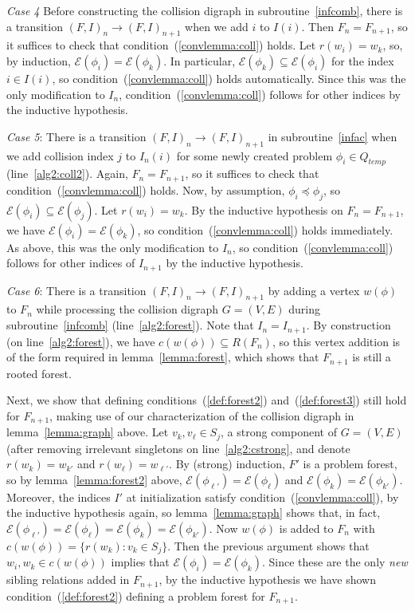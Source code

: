 \documentclass[11pt,reqno]{amsart}
\theoremstyle{definition}
\numberwithin{equation}{section}
\newcommand{\pre}{\phi}
\newcommand{\sub}{\subseteq}
\newcommand{\fix}{\mathcal{E}}
\newcommand{\peq}{\preceq}
\newcommand{\strongcomp}{S}
\newcommand{\actt}{Q_{temp}}
\newcommand{\coll}{I}
\newcommand{\forest}{F}
\newcommand{\pair}{(F,I)}
\newcommand{\roott}{R}
\begin{document}
\begin{enumerate}
\emph{Case 4} Before constructing the collision digraph in subroutine~\ref{infcomb}, there is a transition $\pair_n \to \pair_{n + 1}$ when we add $i$ to $\coll(i)$. 
Then $\forest_n = \forest_{n + 1}$, so it suffices to check that condition~(\ref{convlemma:coll}) holds. 
Let $r(w_i) = w_k$, so, by induction, $\fix(\pre_i) = \fix(\pre_k)$. 
In particular, $\fix(\pre_k) \sub \fix(\pre_i)$ for the index $i \in \coll(i)$, so condition~(\ref{convlemma:coll}) holds automatically.
Since this was the only modification to $\coll_n$, condition~(\ref{convlemma:coll}) follows for other indices by the inductive hypothesis.

\emph{Case 5}: There is a transition $\pair_n \to \pair_{n + 1}$ in subroutine~\ref{infac} when we add collision index $j$ to $\coll_n(i)$ for some newly created problem $\pre_i \in \actt$ (line~\ref{alg2:coll2}).
Again, $\forest_n = \forest_{n + 1}$, so it suffices to check that condition~(\ref{convlemma:coll}) holds. 
Now, by assumption, $\pre_i \peq \pre_j$, so $\fix(\pre_i) \sub \fix(\pre_j)$.
Let $r(w_i) = w_k$.
By the inductive hypothesis on $\forest_n = \forest_{n + 1}$, we have $\fix(\pre_i) = \fix(\pre_k)$, so condition~(\ref{convlemma:coll}) holds immediately.
As above, this was the only modification to $\coll_n$, so condition~(\ref{convlemma:coll}) follows for other indices of $\coll_{n + 1}$ by the inductive hypothesis.

\emph{Case 6}: There is a transition $\pair_n \to \pair_{n + 1}$ by adding a vertex $w(\pre)$ to $\forest_n$ while processing the collision digraph $G = (V,E)$ during subroutine~\ref{infcomb} (line~\ref{alg2:forest}).
Note that $\coll_n = \coll_{n + 1}$. 
By construction (on line~\ref{alg2:forest}), we have $c(w(\pre)) \sub \roott(\forest_n)$, so this vertex addition is of the form required in lemma~\ref{lemma:forest}, which shows that $\forest_{n + 1}$ is still a rooted forest.  

Next, we show that defining conditions~(\ref{def:forest2}) and~(\ref{def:forest3}) still hold for $\forest_{n + 1}$, making use of our characterization of the collision digraph in lemma~\ref{lemma:graph} above.
Let $v_k, v_{\ell} \in \strongcomp_j$, a strong component of $G = (V,E)$ (after removing irrelevant singletons on line~\ref{alg2:cstrong}, and denote $r(w_k) = w_{k'}$ and $r(w_{\ell}) = w_{\ell'}$.
By (strong) induction, $\forest'$ is a problem forest, so by lemma~\ref{lemma:forest2} above, $\fix(\pre_{\ell'}) = \fix(\pre_{\ell})$ and $\fix(\pre_k) = \fix(\pre_{k'})$. 
Moreover, the indices $\coll'$ at initialization satisfy condition~(\ref{convlemma:coll}), by the inductive hypothesis again, so lemma~\ref{lemma:graph} shows that, in fact, $\fix(\pre_{\ell'}) = \fix(\pre_{\ell}) = \fix(\pre_k) = \fix(\pre_{k'})$. 
Now $w(\pre)$ is added to $\forest_n$ with $c(w(\pre)) = \{r(w_k):v_k \in \strongcomp_j\}$. 
Then the previous argument shows that $w_i,w_k \in c(w(\pre))$ implies that $\fix(\pre_i) = \fix(\pre_k)$. 
Since these are the only \emph{new} sibling relations added in $\forest_{n+1}$, by the inductive hypothesis we have shown condition~(\ref{def:forest2}) defining a problem forest for $\forest_{n+1}$. 


\end{enumerate}
\end{document}
